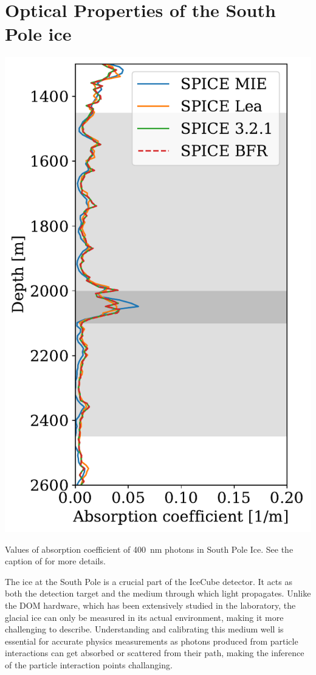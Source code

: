 \section{Optical Properties of the South Pole ice}
\label{sec:icemodel}
\begin{marginfigure}
    \vspace*{-0.5cm}
	\centering \includegraphics{./figures/nu_in_icecube/absorption.pdf}
	\caption[Absorption profile of photons in the South Pole Ice, comparing various ice models]{Values of  absorption coefficient of 400~nm photons in South Pole Ice. See the caption of  for more details.}
\end{marginfigure}
The ice at the South Pole is a crucial part of the IceCube detector. It acts as both the detection target and the medium through which light propagates. Unlike the DOM hardware, which has been extensively studied in the laboratory, the glacial ice can only be measured in its actual environment, making it more challenging to describe. Understanding and calibrating this medium well is essential for accurate physics measurements as photons produced from particle interactions can get absorbed or scattered from their path, making the inference of the particle interaction points challanging.

